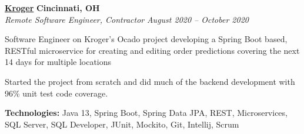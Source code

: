 %
    \headerrow
        {\textbf{\href{https://www.kroger.com/}{Kroger}}}
        {\textbf{Cincinnati, OH}}
    \\
    \headerrow
        {\emph{Remote Software Engineer, Contractor}}
        {\emph{August 2020 -- October 2020}}
    \begin{itemize*}
        \item Software Engineer on Kroger's Ocado project developing a Spring Boot based, RESTful microservice for creating and editing
            order predictions covering the next 14 days for multiple locations
        \item Started the project from scratch and did much of the backend development with 96\% unit test code coverage.
    \end{itemize*}

    \hspace{1.0em}
        {\textbf{Technologies:} Java 13, Spring Boot, Spring Data JPA, REST, Microservices, SQL Server, SQL Developer, JUnit, Mockito,
            Git, Intellij, Scrum}

